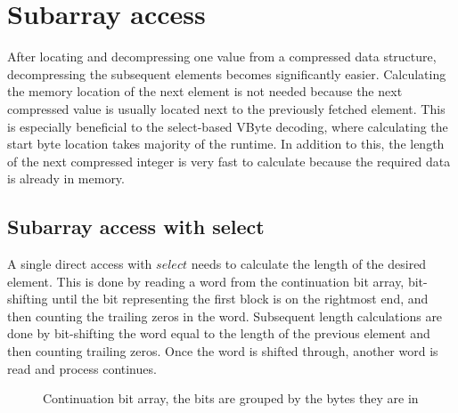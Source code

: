 \chapter{Subarray access}

After locating and decompressing one value from a compressed data structure, decompressing the subsequent elements becomes significantly easier. Calculating the memory location of the next element is not 
needed because the next compressed value is usually located next to the previously fetched element. This is especially beneficial to the select-based VByte decoding, where calculating the start 
byte location takes majority of the runtime. In addition to this, the length of the next compressed integer is very fast to calculate because the required data is already in memory.

\section{Subarray access with select}
A single direct access with $select$ needs to calculate the length of the desired element. This is done by reading a word from the continuation bit array, bit-shifting until the bit representing 
the first block is on the rightmost end, and then counting the trailing zeros in the word. Subsequent length calculations are done by bit-shifting the word equal to the length of the previous element 
and then counting trailing zeros. Once the word is shifted through, another word is read and process continues.

\begin{figure}[ht]
\centering
{}
\caption{Continuation bit array, the bits are grouped by the bytes they are in} \label{subarray}
\end{figure}

